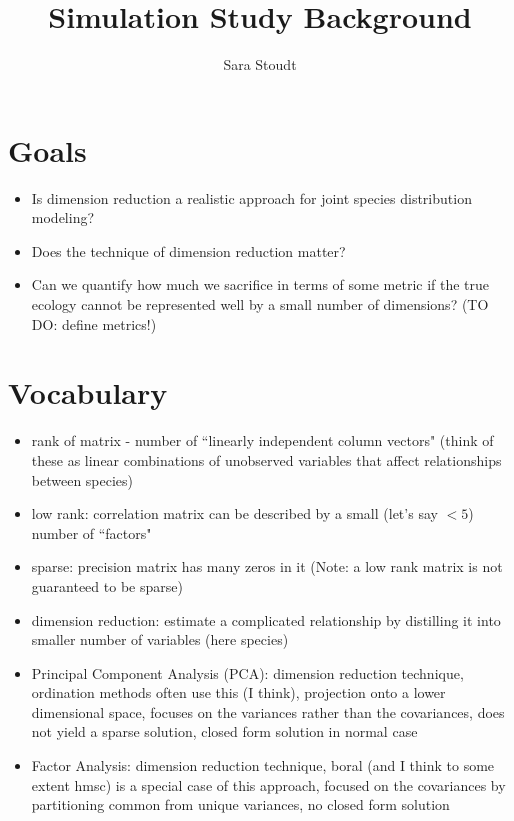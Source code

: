 \documentclass[12pt]{amsart}
\title{Simulation Study Background}
\author{Sara Stoudt}
\begin{document}
\maketitle

\section{Goals}

\begin{itemize}
\item Is dimension reduction a realistic approach for joint species distribution modeling?
\item Does the technique of dimension reduction matter?
\item Can we quantify how much we sacrifice in terms of some metric if the true ecology cannot be represented well by a small number of dimensions? (TO DO: define metrics!)

\end{itemize}

\section{Vocabulary}

\begin{itemize}
\item rank of matrix - number of ``linearly independent column vectors" (think of these as linear combinations of unobserved variables that affect relationships between species)

\item low rank: correlation matrix can be described by a small (let's say $<5$) number of ``factors"
\item sparse: precision matrix has many zeros in it (Note: a low rank matrix is not guaranteed to be sparse)

\item dimension reduction: estimate a complicated relationship by distilling it into smaller number of variables (here species)

\item Principal Component Analysis (PCA): dimension reduction technique, ordination methods often use this (I think), projection onto a lower dimensional space, focuses on the variances rather than the covariances, does not yield a sparse solution, closed form solution in normal case
\item Factor Analysis: dimension reduction technique, boral (and I think to some extent hmsc) is a special case of this approach, focused on the covariances by partitioning common from unique variances, no closed form solution


\end{itemize}
\end{document}
